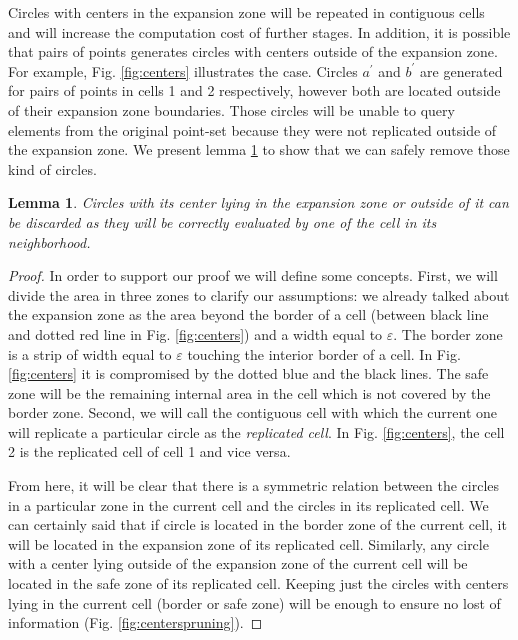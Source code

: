 \documentclass[twocolumn]{IEEEtran}
\newtheorem{lemma}{Lemma}
\begin{document}
Circles with centers in the expansion zone will be repeated in contiguous cells and will increase the computation cost of further stages.  In addition, it is possible that pairs of points generates circles with centers outside of the expansion zone.  For example, Fig. \ref{fig:centers} illustrates the case.  Circles $a^\prime$ and $b^\prime$ are generated for pairs of points in cells 1 and 2 respectively, however both are located outside of their expansion zone boundaries.  Those circles will be unable to query elements from the original point-set because they were not replicated outside of the expansion zone.  We present lemma \ref{lemma:circles} to show that we can safely remove those kind of circles.

\begin{lemma}\label{lemma:circles}
Circles with its center lying in the expansion zone or outside of it can be discarded as they will be correctly evaluated by one of the cell in its neighborhood. 
\end{lemma}

\begin{proof}
  In order to support our proof we will define some concepts.  First, we will divide the area in three zones to clarify our assumptions:  we already talked about the expansion zone as the area beyond the border of a cell (between black line and dotted red line in Fig. \ref{fig:centers}) and a width equal to $\varepsilon$.  The border zone is a strip of width equal to $\varepsilon$ touching the interior border of a cell.  In Fig. \ref{fig:centers} it is compromised by the dotted blue and the black lines.  The safe zone will be the remaining internal area in the cell which is not covered by the border zone.  Second, we will call the contiguous cell with which the current one will replicate a particular circle as the \textit{replicated cell}. In Fig. \ref{fig:centers}, the cell 2 is the replicated cell of cell 1 and vice versa.

  From here, it will be clear that there is a symmetric relation between the circles in a particular zone in the current cell and the circles in its replicated cell.  We can certainly said that if circle is located in the border zone of the current cell, it will be located in the expansion zone of its replicated cell.  Similarly, any circle with a center lying outside of the expansion zone of the current cell will be located in the safe zone of its replicated cell.  Keeping just the circles with centers lying in the current cell (border or safe zone) will be enough to ensure no lost of information (Fig. \ref{fig:centerspruning}).
\end{proof}
\end{document}
